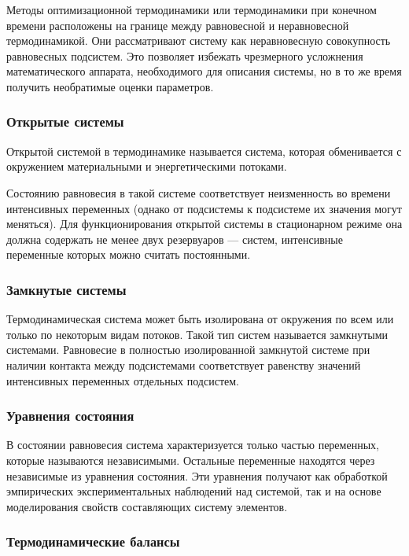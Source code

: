 \documentclass{article}
\begin{document}
	Методы оптимизационной термодинамики или термодинамики при конечном времени расположены на границе между равновесной и неравновесной термодинамикой. Они рассматривают систему как неравновесную совокупность равновесных подсистем. Это позволяет избежать чрезмерного усложнения математического аппарата, необходимого для описания системы, но в то же время получить необратимые оценки параметров.
	
	\subsubsection{Открытые системы}
	
	Открытой системой в термодинамике называется система, которая обменивается с окружением материальными и энергетическими потоками.
	
	Состоянию равновесия в такой системе соответствует неизменность во времени интенсивных переменных (однако от подсистемы к подсистеме их значения могут меняться). Для функционирования открытой системы в стационарном режиме она должна содержать не менее двух резервуаров --- систем, интенсивные переменные которых можно считать постоянными.
	
	\subsubsection{Замкнутые системы}
	
	Термодинамическая система может быть изолирована от окружения по всем или только по некоторым видам потоков. Такой тип систем называется замкнутыми системами. Равновесие в полностью изолированной замкнутой системе при наличии контакта между подсистемами соответствует равенству значений интенсивных переменных отдельных подсистем.
	
	\subsubsection{Уравнения состояния}
	
	В состоянии равновесия система характеризуется только частью переменных, которые называются независимыми. Остальные переменные находятся через независимые из уравнения состояния. Эти уравнения получают как обработкой эмпирических экспериментальных наблюдений над системой, так и на основе моделирования свойств составляющих систему элементов.
	
	\subsubsection{Термодинамические балансы}
	
\end{document}
